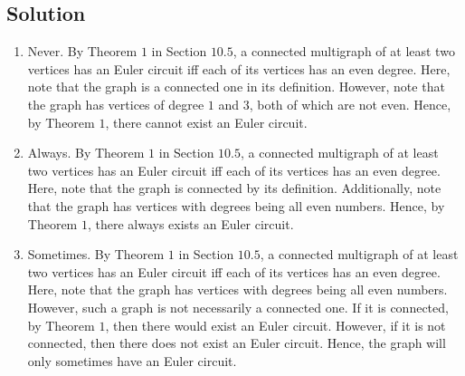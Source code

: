 \documentclass[table]{article}
\begin{document}
\subsection{Solution}
\begin{enumerate}[nosep,label=\alph*)]
\item Never. By Theorem $1$ in Section $10.5$, a connected multigraph of at least two vertices has an Euler circuit iff each of its vertices has an even degree. Here, note that the graph is a connected one in its definition. However, note that the graph has vertices of degree $1$ and $3$, both of which are not even. Hence, by Theorem $1$, there cannot exist an Euler circuit.
\item Always. By Theorem $1$ in Section $10.5$, a connected multigraph of at least two vertices has an Euler circuit iff each of its vertices has an even degree. Here, note that the graph is connected by its definition. Additionally, note that the graph has vertices with degrees being all even numbers. Hence, by Theorem $1$, there always exists an Euler circuit.
\item Sometimes. By Theorem $1$ in Section $10.5$, a connected multigraph of at least two vertices has an Euler circuit iff each of its vertices has an even degree. Here, note that the graph has vertices with degrees being all even numbers. However, such a graph is not necessarily a connected one. If it is connected, by Theorem $1$, then there would exist an Euler circuit. However, if it is not connected, then there does not exist an Euler circuit. Hence, the graph will only sometimes have an Euler circuit.
\end{enumerate}
\end{document}
